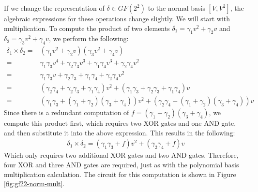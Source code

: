 
If we change the representation of $\delta \in GF(2^2)$ to the normal basis $[V, V^2]$, the algebraic expressions for these operations change slightly. We will start with multiplication. To compute the product of two elements $\delta_1 = \gamma_1 v^2 + \gamma_2 v$ and $\delta_2 = \gamma_3 v^2 + \gamma_4 v$, we perform the following:
\begin{align*}
\delta_1 \times \delta_2 = & (\gamma_1 v^2 + \gamma_2 v)(\gamma_3 v^2 + \gamma_4 v) \\
= & \gamma_1\gamma_3 v^4 + \gamma_2\gamma_3 v^3 + \gamma_1\gamma_4 v^3 + \gamma_2\gamma_4 v^2 \\
= & \gamma_1\gamma_3 v + \gamma_2\gamma_3 + \gamma_1\gamma_4 + \gamma_2\gamma_4 v^2 \\
= & (\gamma_2\gamma_4 + \gamma_2\gamma_3 + \gamma_1\gamma_4)v^2 + (\gamma_1\gamma_3 + \gamma_2\gamma_3 + \gamma_1\gamma_4)v \\
= & (\gamma_1\gamma_3 + (\gamma_1 + \gamma_2)(\gamma_3 + \gamma_4))v^2 + (\gamma_2\gamma_4 + (\gamma_1 + \gamma_2)(\gamma_3 + \gamma_4))v
\end{align*}
Since there is a redundant computation of $f = (\gamma_1 + \gamma_2)(\gamma_3 + \gamma_4)$, we compute this product first, which requires two XOR gates and one AND gate, and then substitute it into the above expression. This results in the following:
\begin{align*}
\delta_1 \times \delta_2 = (\gamma_1\gamma_3 + f)v^2 + (\gamma_2\gamma_4 + f)v
\end{align*}
Which only requires two additional XOR gates and two AND gates. Therefore, four XOR and three AND gates are required, just as with the polynomial basis multiplication calculation. The circuit for this computation is shown in Figure \ref{fig:gf22-norm-mult}.


